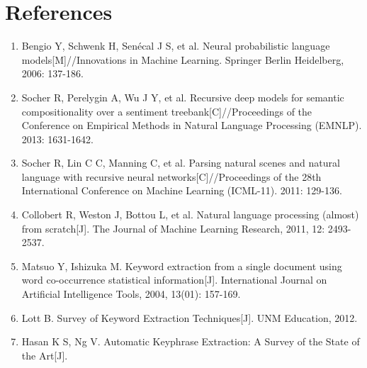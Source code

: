 \documentclass[dvips,12pt]{article}
\begin{document}
	\section{References}
    \begin{enumerate}
        \item Bengio Y, Schwenk H, Senécal J S, et al. Neural probabilistic language models[M]//Innovations in Machine Learning. Springer Berlin Heidelberg, 2006: 137-186.
        \item Socher R, Perelygin A, Wu J Y, et al. Recursive deep models for semantic compositionality over a sentiment treebank[C]//Proceedings of the Conference on Empirical Methods in Natural Language Processing (EMNLP). 2013: 1631-1642.
        \item Socher R, Lin C C, Manning C, et al. Parsing natural scenes and natural language with recursive neural networks[C]//Proceedings of the 28th International Conference on Machine Learning (ICML-11). 2011: 129-136.
        \item Collobert R, Weston J, Bottou L, et al. Natural language processing (almost) from scratch[J]. The Journal of Machine Learning Research, 2011, 12: 2493-2537.
        \item Matsuo Y, Ishizuka M. Keyword extraction from a single document using word co-occurrence statistical information[J]. International Journal on Artificial Intelligence Tools, 2004, 13(01): 157-169.
        \item Lott B. Survey of Keyword Extraction Techniques[J]. UNM Education, 2012.
        \item Hasan K S, Ng V. Automatic Keyphrase Extraction: A Survey of the State of the Art[J].
    \end{enumerate}
\end{document}
